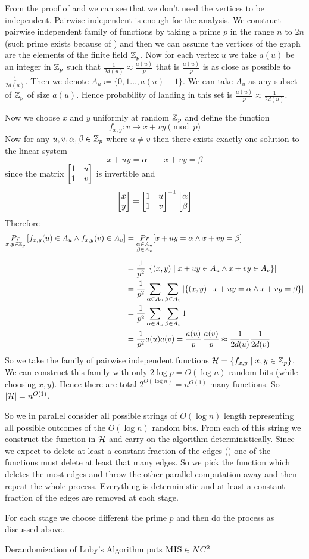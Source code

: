 From the proof of  and  we can see that we don't need the vertices to be independent. Pairwise independent is enough for the analysis. We construct pairwise independent family of functions by taking a prime $p$ in the range $n$ to $2n$ (such prime exists because of ) and then we can assume the vertices of the graph are the elements of the finite field $\mathbb{Z}_p$. Now for each vertex $u$ we take $a(u)$ be an integer in $\mathbb{Z}_p$ such that  $\frac1{2d(u)}\approx  \frac{a(u)}{p}$ that is $\frac{a(u)}{p}$ is as close as possible to $\frac1{2d(u)}$. Then we denote $A_u\coloneqq \{0,1\dots, a(u)-1\}$. We can take $A_u$ as any subset of $\mathbb{Z}_p$ of size $a(u)$.  Hence probability of landing in this set is $\frac{a(u)}{p}\approx \frac1{2d(u)}$.

Now we choose $x$ and $y$ uniformly at random $\mathbb{Z}_p$ and define the function $$f_{x,y}:v\mapsto x+vy\pmod{p}$$Now for any $u,v,\alpha,\beta\in \mathbb{Z}_p$ where $u\neq v$ then there exists exactly one solution to the linear system $$x+uy=\alpha \qquad x+vy=\beta$$ since the matrix $\left[\begin{matrix}1& u\\ 1& v\end{matrix}\right]$ is invertible and $$\left[\begin{matrix}x\\ y\end{matrix}\right] =\left[\begin{matrix}1&u\\ 1&v\end{matrix}\right]^{-1}\left[\begin{matrix}\alpha\\ \beta\end{matrix}\right]$$Therefore\begin{align*}
	\underset{x,y\in \mathbb{Z}_p}{Pr}\left[f_{x,y}(u)\in A_u\wedge f_{x,y}(v)\in A_v\right] & = \underset{\substack{\alpha\in A_u\\ \beta\in A_v}}{Pr}[x+uy=\alpha \wedge x+vy=\beta]\\[2mm]
	& = \frac1{p^2} \left| \{(x,y)\mid x+uy\in A_u\wedge x+vy\in A_v \} \right|\\
	& = \frac1{p^2} \sum_{\alpha\in A_u}\sum_{\beta\in A_v} |\{(x,y)\mid x+uy=\alpha \wedge x+vy=\beta\}|\\
	& = \frac1{p^2} \sum_{\alpha\in A_u}\sum_{\beta\in A_v}1\\
	& = \frac1{p^2}a(u)a(v)=\frac{a(u)}{p}\, \frac{a(v)}{p}\approx \frac1{2d(u)}\frac1{2d(v)}
\end{align*}
So we take the family of pairwise independent functions $\mathcal{H}=\{ f_{x,y}\mid x,y\in \mathbb{Z}_p\}$. We can construct this family with only $2\log p=O(\log n)$ random bits (while choosing $x,y$). Hence there are total $2^{O(\log n)}=n^{O(1)}$ many functions. So $|\mathcal{H}|=n^{O(1)}$. 

So we in parallel  consider all possible strings of $O(\log n)$ length representing all possible outcomes of the $O(\log n)$ random bits. From each of this string we construct the function in $\mathcal{H}$ and carry on the algorithm deterministically. Since we expect to delete at least a constant fraction of the edges () one of the functions must delete at least that many edges. So we pick the function which deletes the most edges and throw the other parallel computation away and then repeat the whole process. Everything is deterministic and at least a constant fraction of the edges are removed at each stage. 

For each stage we choose different the prime $p$ and then do the process as discussed above.
\begin{theorem}
	Derandomization of Luby's Algorithm puts $\textsc{MIS}\in NC^2$
\end{theorem}